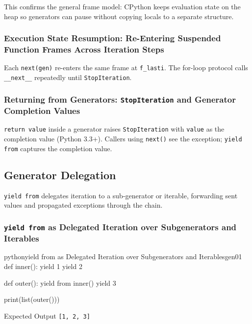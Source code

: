 \documentclass[a4paper,twoside]{report}
\begin{document}
This confirms the general frame model: CPython keeps evaluation state on the heap so generators can pause without copying locals to a separate structure.

\subsubsection{Execution State Resumption: Re-Entering Suspended Function Frames Across Iteration Steps}

Each \texttt{next(gen)} re-enters the same frame at \texttt{f\_lasti}. The for-loop protocol calls \texttt{\_\_next\_\_} repeatedly until \texttt{StopIteration}.

\subsubsection{Returning from Generators: \texttt{StopIteration} and Generator Completion Values}

\texttt{return value} inside a generator raises \texttt{StopIteration} with \texttt{value} as the completion value (Python 3.3+). Callers using \texttt{next()} see the exception; \texttt{yield from} captures the completion value.


\subsection{Generator Delegation}

\texttt{yield from} delegates iteration to a sub-generator or iterable, forwarding sent values and propagated exceptions through the chain.

\subsubsection{\texttt{yield from} as Delegated Iteration over Subgenerators and Iterables}

\begin{codebox}[]{python}{yield from as Delegated Iteration over Subgenerators and Iterables}{gen01}
def inner():
    yield 1
    yield 2

def outer():
    yield from inner()
    yield 3

print(list(outer()))
\end{codebox}


\begin{iobox}{Expected Output}
\texttt{[1, 2, 3]} \\
\end{iobox}
\end{document}
